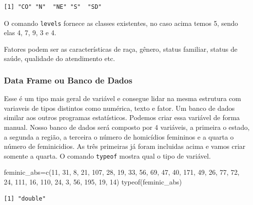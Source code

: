 \documentclass[
  letterpaper,
  DIV=11,
  numbers=noendperiod]{scrreprt}
\newenvironment{Shaded}{\begin{snugshade}}{\end{snugshade}}
\newcommand{\DecValTok}[1]{\textcolor[rgb]{0.68,0.00,0.00}{#1}}
\newcommand{\FunctionTok}[1]{\textcolor[rgb]{0.28,0.35,0.67}{#1}}
\newcommand{\NormalTok}[1]{\textcolor[rgb]{0.00,0.23,0.31}{#1}}
\newcommand{\OtherTok}[1]{\textcolor[rgb]{0.00,0.23,0.31}{#1}}
\begin{document}
\begin{verbatim}
[1] "CO" "N"  "NE" "S"  "SD"
\end{verbatim}

O comando \texttt{levels} fornece as classes existentes, no caso acima
temos 5, sendo elas 4, 7, 9, 3 e 4.

Fatores podem ser as características de raça, gênero, status familiar,
status de saúde, qualidade do atendimento etc.

\subsubsection{Data Frame ou Banco de
Dados}\label{data-frame-ou-banco-de-dados}

Esse é um tipo mais geral de variável e consegue lidar na mesma
estrutura com variaveis de tipos distintos como numérica, texto e fator.
Um banco de dados similar aos outros programas estatísticos. Podemos
criar essa variável de forma manual. Nosso banco de dados será composto
por 4 variáveis, a primeira o estado, a segunda a região, a terceira o
número de homicídios femininos e a quarta o número de feminicidios. As
três primeiras já foram incluidas acima e vamos criar somente a quarta.
O comando \texttt{typeof} mostra qual o tipo de variável.

\begin{Shaded}
\begin{Highlighting}[]
\NormalTok{feminic\_abs}\OtherTok{=}\FunctionTok{c}\NormalTok{(}\DecValTok{11}\NormalTok{,  }\DecValTok{31}\NormalTok{,  }\DecValTok{8}\NormalTok{,  }\DecValTok{21}\NormalTok{,  }\DecValTok{107}\NormalTok{,  }\DecValTok{28}\NormalTok{,  }\DecValTok{19}\NormalTok{,  }\DecValTok{33}\NormalTok{,  }\DecValTok{56}\NormalTok{,  }\DecValTok{69}\NormalTok{,  }\DecValTok{47}\NormalTok{,  }\DecValTok{40}\NormalTok{,  }\DecValTok{171}\NormalTok{,  }\DecValTok{49}\NormalTok{,  }\DecValTok{26}\NormalTok{,  }\DecValTok{77}\NormalTok{,  }\DecValTok{72}\NormalTok{,  }\DecValTok{24}\NormalTok{,  }\DecValTok{111}\NormalTok{,  }\DecValTok{16}\NormalTok{,  }\DecValTok{110}\NormalTok{,  }\DecValTok{24}\NormalTok{,  }\DecValTok{3}\NormalTok{,  }\DecValTok{56}\NormalTok{,  }\DecValTok{195}\NormalTok{,  }\DecValTok{19}\NormalTok{,  }\DecValTok{14}\NormalTok{) }
\FunctionTok{typeof}\NormalTok{(feminic\_abs)}
\end{Highlighting}
\end{Shaded}

\begin{verbatim}
[1] "double"
\end{verbatim}
\end{document}
